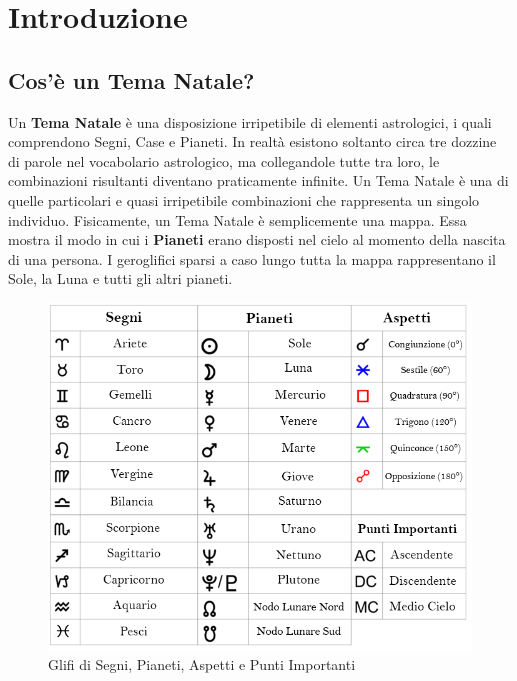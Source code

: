 \chapter{Introduzione}
\label{cap:int}
\section{Cos'è un Tema Natale?}
Un \textbf{Tema Natale} è una disposizione irripetibile di elementi astrologici, i quali comprendono Segni, Case e Pianeti.\newline
In realtà esistono soltanto circa tre dozzine di parole nel vocabolario astrologico, ma collegandole tutte tra loro, le combinazioni risultanti diventano praticamente infinite.\newline
Un Tema Natale è una di quelle particolari e quasi irripetibile combinazioni che rappresenta un singolo individuo.\newline
Fisicamente, un Tema Natale è semplicemente una mappa. Essa mostra il modo in cui i \textbf{Pianeti} erano disposti nel cielo al momento della nascita di una persona.\newline
I geroglifici sparsi a caso lungo tutta la mappa rappresentano il Sole, la Luna e tutti gli altri pianeti.\newline
\begin{figure}[H]
\centering
\includegraphics[width=\textwidth, height=0.35\textheight, keepaspectratio]{img/glyph.png}
\caption{Glifi di Segni, Pianeti, Aspetti e Punti Importanti}
\label{fig:glyph}
\end{figure}

